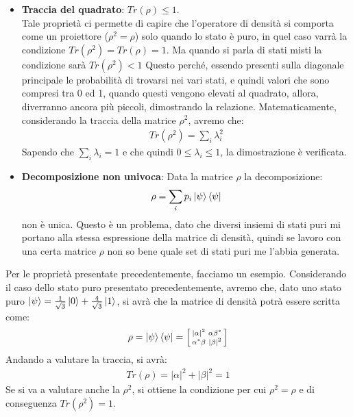 \begin{info}
\begin{itemize}
 \item \textbf{Traccia del quadrato}: \(Tr(\rho) \le 1\).\\
       Tale proprietà ci permette di capire che l'operatore di densità si comporta come un proiettore (\(\rho^2=\rho\)) solo quando lo stato è puro, in quel caso varrà la condizione \(Tr(\rho^2) = Tr(\rho) = 1\). Ma quando si parla di stati misti la condizione sarà \(Tr(\rho^2)<1\) Questo perché, essendo presenti sulla diagonale principale le probabilità di trovarsi nei vari stati, e quindi valori che sono compresi tra 0 ed 1, quando questi vengono elevati al quadrato, allora, diverranno ancora più piccoli, dimostrando la relazione. Matematicamente, considerando la traccia della matrice \(\rho^2\), avremo che:
       \begin{gather*}
              Tr(\rho^2)=\sum_{i}\lambda_i^2
       \end{gather*}
       Sapendo che \(\sum_{i}\lambda_i = 1\) e che quindi \(0 \le \lambda_i \le 1\), la dimostrazione è verificata.

       \item \textbf{Decomposizione non univoca}: Data la matrice \(\rho\) la decomposizione:
       \begin{gather*}
              \rho = \sum_{i}p_i \ket{\psi}\bra{\psi}       
       \end{gather*}
       non è unica. Questo è un problema, dato che diversi insiemi di stati puri mi portano alla stessa espressione della matrice di densità, quindi se lavoro con una certa matrice \(\rho\) non so bene quale set di stati puri me l'abbia generata.
\end{itemize}
\end{info}

Per le proprietà presentate precedentemente, facciamo un esempio. Considerando il caso dello stato puro presentato precedentemente, avremo che, dato uno stato puro \(\ket{\psi} = \frac{1}{\sqrt{3}}\ket{0} + \frac{4}{\sqrt{3}} \ket{1}\), si avrà che la matrice di densità potrà essere scritta come:
\begin{gather*}
       \rho = \ket{\psi}\bra{\psi}=
       \left[\begin{smallmatrix}
       |\alpha|^2 & \alpha \beta^* \\
       \alpha^* \beta & |\beta|^2        
       \end{smallmatrix}\right]
\end{gather*}
Andando a valutare la traccia, si avrà:
\begin{gather*}
       Tr(\rho) = |\alpha|^2 + |\beta|^2 = 1
\end{gather*}
Se si va a valutare anche la \(\rho^2\), si ottiene la condizione per cui \(\rho^2 = \rho\) e di conseguenza \(Tr(\rho^2) = 1\). 

